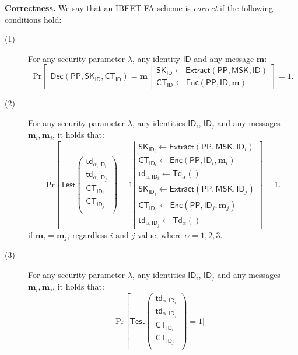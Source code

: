 \documentclass[runningheads,10pt]{llncs}
\def\bf{\mathbf}
\def\SK{\mathsf{SK}}
\def\PP{\mathsf{PP}}
\def\MSK{\mathsf{MSK}}
\def\CT{\mathsf{CT}}
\def\td{\mathsf{td}}
\def\Enc{\mathsf{Enc}}
\def\Extract{\mathsf{Extract}}
\def\Dec{\mathsf{Dec}}
\def\Td{\mathsf{Td}}
\def\Test{\mathsf{Test}}
\def\Pr{\mathrm{Pr}}
\def\ID{\mathsf{ID}}
\begin{document}
\noindent\textbf{Correctness.} We say that an IBEET-FA scheme is \textit{correct} if the following conditions hold:
\begin{description}
	\item[(1)] For any security parameter $\lambda$, any identity $\ID$ and any message $\bf{m}$:
	$$\Pr\left[ {\begin{gathered}
		\Dec(\PP,\SK_{\ID},\CT_{\ID})=\bf{m}\end{gathered}  
		\left| \begin{gathered}
		\SK_{\ID}\gets\Extract(\PP,\MSK,\ID)\\
		\CT_{\ID}\gets\Enc(\PP,\ID,\bf{m})
		\end{gathered}  \right.} \right]=1.$$
	\item[(2)] For any security parameter $\lambda$, any identities $\ID_i$, $\ID_j$ and any messages $\bf{m}_i, \bf{m}_j$, it holds that:    
	$$\Pr\left[{
		\Test\left( \begin{gathered}
		\td_{\alpha, \ID_i} \\
		\td_{\alpha, \ID_j} \\
		\CT_{\ID_i} \\
		\CT_{\ID_j} \\ 
		\end{gathered}  \right) = 1\left| \begin{array}{l}
		\SK_{\ID_i}\gets\Extract(\PP,\MSK,\ID_i) \\
		\CT_{\ID_i}\gets\Enc(\PP,\ID_i,\bf{m}_i) \\
		\td_{\alpha, \ID_i}\gets\Td_\alpha () \\
		\SK_{\ID_j}\gets\Extract(\PP,\MSK,\ID_j) \\
		\CT_{\ID_j}\gets\Enc(\PP,\ID_j,\bf{m}_j) \\
		\td_{\alpha, \ID_j}\gets\Td_\alpha () 
		\end{array}  \right.} \right]=1.$$
	if $\bf{m}_i=\bf{m}_j$, regardless $i$ and $j$ value, where $\alpha = 1, 2, 3$.
	\item[(3)] For any security parameter $\lambda$, any identities $\ID_i$, $\ID_j$ and any messages $\bf{m}_i, \bf{m}_j$, it holds that:    
	$$\Pr\left[{
		\Test\left( \begin{gathered}
		\td_{\alpha, \ID_i} \\
		\td_{\alpha, \ID_j} \\
		\CT_{\ID_i} \\
		\CT_{\ID_j} \\ 
		\end{gathered}  \right) = 1\left| \begin{array}{l}

\end{array}}$$
\end{description}
\end{document}
